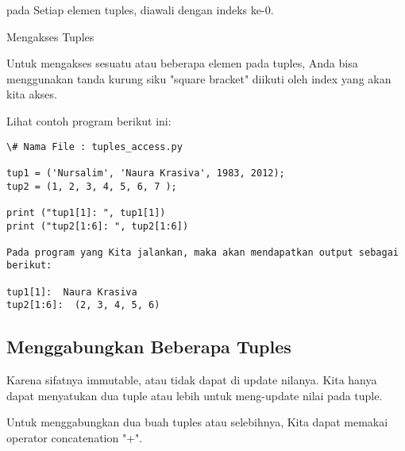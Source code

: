 pada Setiap elemen tuples, diawali dengan indeks ke-0.

Mengakses Tuples


Untuk mengakses sesuatu atau beberapa elemen pada tuples, Anda bisa menggunakan tanda kurung siku "square bracket" diikuti oleh index yang akan kita akses.

Lihat contoh program berikut ini:
\begin{verbatim}
\# Nama File : tuples_access.py

tup1 = ('Nursalim', 'Naura Krasiva', 1983, 2012);
tup2 = (1, 2, 3, 4, 5, 6, 7 );

print ("tup1[1]: ", tup1[1])
print ("tup2[1:6]: ", tup2[1:6])

Pada program yang Kita jalankan, maka akan mendapatkan output sebagai berikut:

tup1[1]:  Naura Krasiva
tup2[1:6]:  (2, 3, 4, 5, 6)
\end{verbatim}

\subsection {Menggabungkan Beberapa Tuples}
Karena sifatnya immutable, atau tidak dapat di update nilanya. Kita hanya dapat menyatukan dua tuple atau lebih untuk meng-update nilai pada tuple.

Untuk menggabungkan dua buah tuples atau selebihnya, Kita dapat memakai operator concatenation "+".

